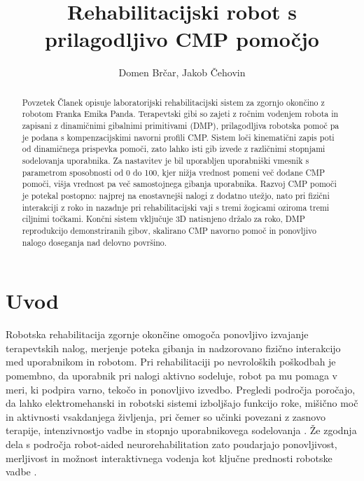 \documentclass[a4paper]{article}
\begin{document}
\sloppy

\title{Rehabilitacijski robot s prilagodljivo CMP pomočjo}

\author{Domen Brčar, Jakob Čehovin}



\maketitle

\begin{abstract}{Povzetek}
Članek opisuje laboratorijski rehabilitacijski sistem za zgornjo okončino z
robotom Franka Emika Panda. Terapevtski gibi so zajeti z ročnim vodenjem robota
in zapisani z dinamičnimi gibalnimi primitivami (DMP), prilagodljiva robotska
pomoč pa je podana s kompenzacijskimi navorni profili CMP. Sistem loči
kinematični zapis poti od dinamičnega prispevka pomoči, zato lahko isti gib
izvede z različnimi stopnjami sodelovanja uporabnika. Za nastavitev je bil
uporabljen uporabniški vmesnik s parametrom sposobnosti od 0 do 100, kjer nižja
vrednost pomeni več dodane CMP pomoči, višja vrednost pa več samostojnega
gibanja uporabnika. Razvoj CMP pomoči je potekal postopno: najprej na
enostavnejši nalogi z dodatno utežjo, nato pri fizični interakciji z roko in
nazadnje pri rehabilitacijski vaji s tremi žogicami oziroma tremi ciljnimi
točkami. Končni sistem vključuje 3D natisnjeno držalo za roko, DMP reprodukcijo
demonstriranih gibov, skalirano CMP navorno pomoč in ponovljivo nalogo
doseganja nad delovno površino.
\end{abstract}

\section{Uvod}

Robotska rehabilitacija zgornje okončine omogoča ponovljivo izvajanje
terapevtskih nalog, merjenje poteka gibanja in nadzorovano fizično interakcijo
med uporabnikom in robotom. Pri rehabilitaciji po nevroloških poškodbah je
pomembno, da uporabnik pri nalogi aktivno sodeluje, robot pa mu pomaga v meri,
ki podpira varno, tekočo in ponovljivo izvedbo. Pregledi področja poročajo, da
lahko elektromehanski in robotski sistemi izboljšajo funkcijo roke, mišično moč
in aktivnosti vsakdanjega življenja, pri čemer so učinki povezani z zasnovo
terapije, intenzivnostjo vadbe in stopnjo uporabnikovega sodelovanja
\cite{mehrholz2018cochrane}. Že zgodnja dela s področja robot-aided
neurorehabilitation zato poudarjajo ponovljivost, merljivost in možnost
interaktivnega vodenja kot ključne prednosti robotske vadbe
\cite{krebs1998robot}.
\end{document}
